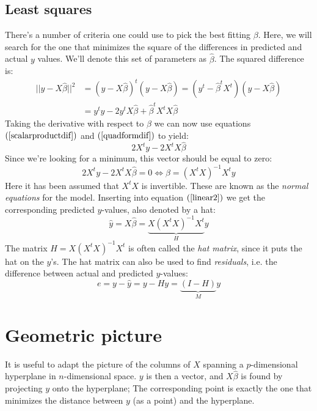 \documentclass[12pt, a4paper]{article}
\begin{document}
\subsection{Least squares}
There's a number of criteria one could use to pick the best fitting $\beta$. Here, we will search for the one that minimizes the square of the differences in predicted and actual $y$ values. We'll denote this set of parameters as $\hat{\beta}$. The squared difference is:
\begin{align*}
||y-X\hat{\beta}||^2 &=(y-X\hat{\beta})^t(y-X\hat{\beta})=(y^t-\hat{\beta}^t X^t)(y-X\hat{\beta})\\
&=y^t y - 2y^t X\hat{\beta} + \hat{\beta}^t X^t X\hat{\beta}
\end{align*}
Taking the derivative with respect to $\beta$ we can now use equations $(\ref{scalarproductdif})$ and $(\ref{quadformdif})$ to yield:
\begin{equation}
2X^t y - 2X^t X\hat{\beta}
\end{equation}
Since we're looking for a minimum, this vector should be equal to zero:
\begin{equation}
\label{normaleq}
2X^t y - 2X^t X\hat{\beta}=0\Leftrightarrow\hat{\beta}=(X^t X)^{-1}X^t y
\end{equation}
Here it has been assumed that $X^t X$ is invertible. These are known as the \textit{normal equations} for the model. Inserting into equation $(\ref{linear2})$ we get the corresponding predicted $y$-values, also denoted by a hat:
\begin{equation}
\hat{y}=X\hat{\beta}=\underbrace{X(X^t X)^{-1}X^t}_{H}y
\end{equation}
The matrix $H=X(X^t X)^{-1}X^t$ is often called the \textit{hat matrix}, since it puts the hat on the $y$'s. The hat matrix can also be used to find \textit{residuals}, i.e. the difference between actual and predicted $y$-values:
\begin{equation}
e=y-\hat{y}=y-Hy=\underbrace{(I-H)}_{M} y
\end{equation}

\section{Geometric picture}
It is useful to adapt the picture of the columns of $X$ spanning a $p$-dimensional hyperplane in $n$-dimensional space. $y$ is then a vector, and $X\hat{\beta}$ is found by projecting $y$ onto the hyperplane; The corresponding point is exactly the one that minimizes the distance between $y$ (as a point) and the hyperplane.
\end{document}
